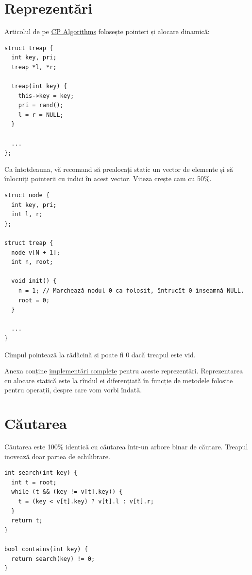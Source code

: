 \documentclass[../main.tex]{subfiles}
\begin{document}
\section{Reprezentări}

Articolul de pe \href{https://cp-algorithms.com/data_structures/treap.html}{CP Algorithms} folosește pointeri și alocare dinamică:

\begin{verbatim}
struct treap {
  int key, pri;
  treap *l, *r;

  treap(int key) {
    this->key = key;
    pri = rand();
    l = r = NULL;
  }

  ...
};
\end{verbatim}

Ca întotdeauna, vă recomand să prealocați static un vector de elemente și să înlocuiți pointerii cu indici în acest vector. Viteza crește cam cu 50\%.

\begin{verbatim}
struct node {
  int key, pri;
  int l, r;
};

struct treap {
  node v[N + 1];
  int n, root;

  void init() {
    n = 1; // Marchează nodul 0 ca folosit, întrucît 0 înseamnă NULL.
    root = 0;
  }

  ...
}
\end{verbatim}

Cîmpul  pointează la rădăcină și poate fi 0 dacă treapul este vid.

\label{problem:treap}

Anexa conține \hyperref[code:treap]{implementări complete} pentru aceste reprezentări. Reprezentarea cu alocare statică este la rîndul ei diferențiată în funcție de metodele folosite pentru operații, despre care vom vorbi îndată.

\section{Căutarea}

Căutarea este 100\% identică cu căutarea într-un arbore binar de căutare. Treapul inovează doar partea de echilibrare.

\begin{verbatim}
int search(int key) {
  int t = root;
  while (t && (key != v[t].key)) {
    t = (key < v[t].key) ? v[t].l : v[t].r;
  }
  return t;
}

bool contains(int key) {
  return search(key) != 0;
}
\end{verbatim}
\end{document}
